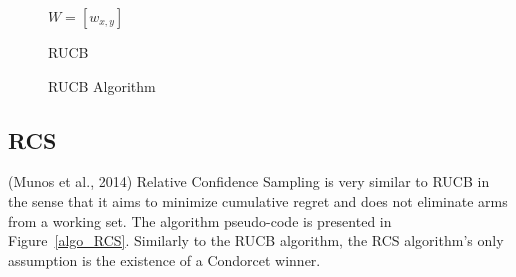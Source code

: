 \documentclass[MSc,beforeExam]{iitcsthesis}
\begin{document}
	\begin{figure}[h]
	\IncMargin{1em}
		\begin{algorithm}[H]
		
		$ W = [w_{x,y}]$\\
		\BlankLine
			\caption{RUCB}
		\end{algorithm}
		\caption{RUCB Algorithm}\label{algo_RUCB}
	\end{figure}
	
	\newpage
\subsection{RCS}
	(Munos et al., 2014) Relative Confidence Sampling \cite{zoghi2014relative} is very similar to RUCB in the sense that it aims to minimize cumulative regret and does not eliminate arms from a working set.
	The algorithm pseudo-code is presented in Figure~\ref{algo_RCS}.
	Similarly to the RUCB algorithm, the RCS algorithm's only assumption is the existence of a Condorcet winner.
	
\end{document}
